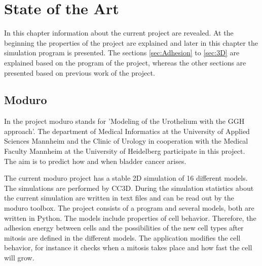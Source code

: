 \chapter{State of the Art}
In this chapter information about the current project are revealed. At the beginning the properties of the project are explained and later in this chapter the simulation program is presented. The sections \ref{sec:Adhesion} to \ref{sec:3D} are explained based on the program of the project, whereas the other sections are presented based on previous work of the project.

\section{Moduro}
In the project moduro stands for 'Modeling of the Urothelium with the \ac{GGH} approach'. The department of Medical Informatics at the University of Applied Sciences Mannheim and the Clinic of Urology in cooperation with the Medical Faculty Mannheim at the University of Heidelberg participate in this project. The aim is to predict how and when bladder cancer arises.

The current moduro project has a stable 2D simulation of 16 different models. The simulations are performed by \ac{CC3D}. During the simulation statistics about the current simulation are written in text files and can be read out by the moduro toolbox. \newline
The project consists of a program and several models, both are written in Python. The models include properties of cell behavior. Therefore, the adhesion energy between cells and the possibilities of the new cell types after mitosis are defined in the different models. The application modifies the cell behavior, for instance it checks when a mitosis takes place and how fast the cell will grow.


